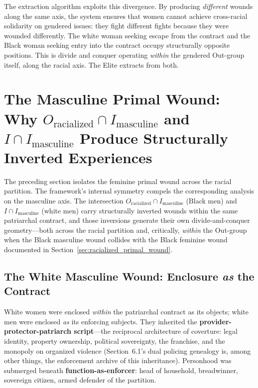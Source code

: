The extraction algorithm exploits this divergence. By producing \textit{different} wounds along the same axis, the system ensures that women cannot achieve cross-racial solidarity on gendered issues: they fight different fights because they were wounded differently. The white woman seeking escape from the contract and the Black woman seeking entry into the contract occupy structurally opposite positions. This is divide and conquer operating \textit{within} the gendered Out-group itself, along the racial axis. The Elite extracts from both.

\section{The Masculine Primal Wound: Why $O_{\text{racialized}} \cap I_{\text{masculine}}$ and $I \cap I_{\text{masculine}}$ Produce Structurally Inverted Experiences}
\label{sec:masculine_primal_wound}

The preceding section isolates the feminine primal wound across the racial partition. The framework's internal symmetry compels the corresponding analysis on the masculine axis. The intersection $O_{\text{racialized}} \cap I_{\text{masculine}}$ (Black men) and $I \cap I_{\text{masculine}}$ (white men) carry structurally inverted wounds within the same patriarchal contract, and those inversions generate their own divide-and-conquer geometry---both across the racial partition and, critically, \textit{within} the Out-group when the Black masculine wound collides with the Black feminine wound documented in Section~\ref{sec:racialized_primal_wound}.

\subsection{The White Masculine Wound: Enclosure \textit{as} the Contract}

White women were enclosed \textit{within} the patriarchal contract as its objects; white men were enclosed \textit{as} its enforcing subjects. They inherited the \textbf{provider-protector-patriarch script}---the reciprocal architecture of coverture: legal identity, property ownership, political sovereignty, the franchise, and the monopoly on organized violence (Section~6.1's dual policing genealogy is, among other things, the enforcement archive of this inheritance). Personhood was submerged beneath \textbf{function-as-enforcer}: head of household, breadwinner, sovereign citizen, armed defender of the partition.

